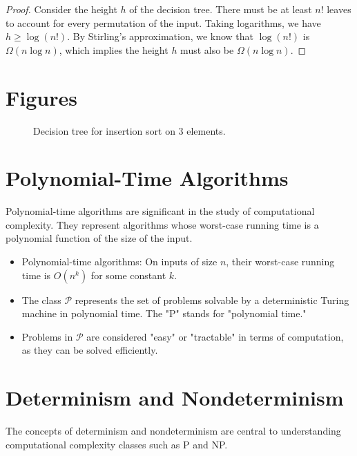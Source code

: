 \documentclass[12pt,openany]{book}
\theoremstyle{definition}
\begin{document}
\begin{proof}
	Consider the height \( h \) of the decision tree. There must be at least \( n! \) leaves to account for every permutation of the input. Taking logarithms, we have \( h \geq \log(n!) \). By Stirling's approximation, we know that \( \log(n!) \) is \( \Omega(n \log n) \), which implies the height \( h \) must also be \( \Omega(n \log n) \).
\end{proof}

\section{Figures}
\begin{figure}[ht]
	\centering
	\caption{Decision tree for insertion sort on 3 elements.}
\end{figure}

\section{Polynomial-Time Algorithms}
Polynomial-time algorithms are significant in the study of computational complexity. They represent algorithms whose worst-case running time is a polynomial function of the size of the input.

\begin{itemize}
	\item Polynomial-time algorithms: On inputs of size \( n \), their worst-case running time is \( O(n^k) \) for some constant \( k \).
	\item The class \( \mathcal{P} \) represents the set of problems solvable by a deterministic Turing machine in polynomial time. The "P" stands for "polynomial time."
	\item Problems in \( \mathcal{P} \) are considered "easy" or "tractable" in terms of computation, as they can be solved efficiently.
\end{itemize}

\section{Determinism and Nondeterminism}
The concepts of determinism and nondeterminism are central to understanding computational complexity classes such as P and NP.
\end{document}
